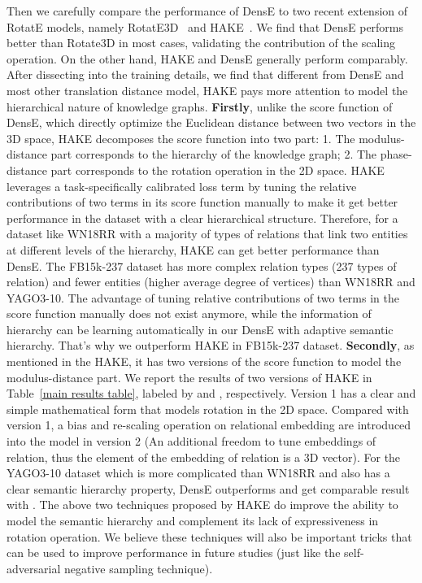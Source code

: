 \documentclass[11pt]{article}
\begin{document}
Then we carefully compare the performance of DensE to two recent extension of RotatE models, namely RotatE3D~\cite{gao2020rotate3d} and HAKE~\cite{zhang2020learning}. We find that DensE performs better than Rotate3D in most cases, validating the contribution of the scaling operation. 
On the other hand, HAKE and DensE generally perform comparably. After dissecting into the training details, we find that different from DensE and most other translation distance model, HAKE pays more attention to model the hierarchical nature of knowledge graphs. \textbf{Firstly}, unlike the score function of DensE, which directly optimize the Euclidean distance between two vectors in the 3D space, HAKE decomposes the score function into two part: 1. The modulus-distance part corresponds to the hierarchy of the knowledge graph; 2. The phase-distance part corresponds to the rotation operation in the 2D space. HAKE leverages a task-specifically calibrated loss term by tuning the relative contributions of two terms in its score function manually to make it get better performance in the dataset with a clear hierarchical structure. Therefore, for a dataset like WN18RR with a majority of types of relations that link two entities at different levels of the hierarchy, HAKE can get better performance than DensE. The FB15k-237 dataset has more complex relation types (237 types of relation) and fewer entities (higher average degree of vertices) than WN18RR and YAGO3-10. The advantage of tuning relative contributions of two terms in the score function manually does not exist anymore, while the information of hierarchy can be learning automatically in our DensE with adaptive semantic hierarchy. That’s why we outperform HAKE in FB15k-237 dataset. \textbf{Secondly}, as mentioned in the HAKE, it has two versions of the score function to model the modulus-distance part. We report the results of two versions of HAKE in Table~\ref{main results table}, labeled by  and , respectively. Version 1 has a clear and simple mathematical form that models rotation in the 2D space. Compared with version 1, a bias and re-scaling operation on relational embedding are introduced into the model in version 2 (An additional freedom to tune embeddings of relation, thus the element of the embedding of relation is a 3D vector). For the YAGO3-10 dataset which is more complicated than WN18RR and also has a clear semantic hierarchy property, DensE outperforms  and get comparable result with . The above two techniques proposed by HAKE do improve the ability to model the semantic hierarchy and complement its lack of expressiveness in rotation operation. We believe these techniques will also be important tricks that can be used to improve performance in future studies (just like the self-adversarial negative sampling technique).
\end{document}
